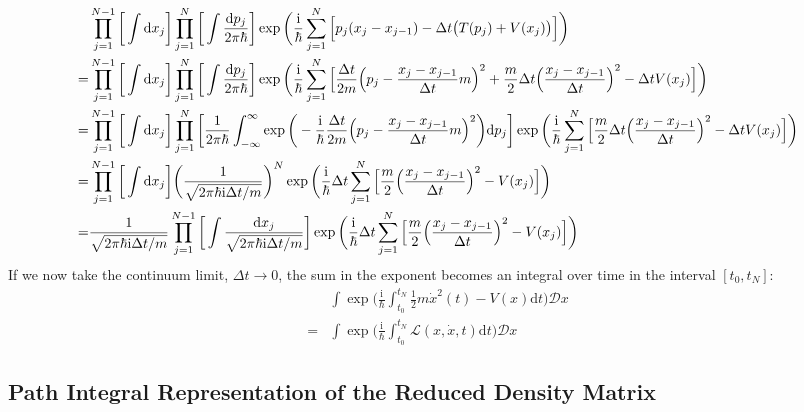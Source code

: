 \documentclass[9pt]{report}
\begin{document}
\begin{align}
&\prod_{j=1}^{N-1}\bigg[\int\mathrm{d}x_j\bigg]\prod_{j=1}^{N}\bigg[\int\frac{\mathrm{d}p_j}{2\pi\hbar}\bigg]\exp\bigg(\frac{\mathrm{i}}{\hbar}\sum_{j=1}^{N}\Big[p_j(x_j-x_{j-1})-\Delta t\big(T(p_j)+V(x_j)\big)\Big]\bigg)\\
=& \prod_{j=1}^{N-1}\bigg[\int\mathrm{d}x_j\bigg]\prod_{j=1}^{N}\bigg[\int\frac{\mathrm{d}p_j}{2\pi\hbar}\bigg]\exp\bigg(\frac{\mathrm{i}}{\hbar}\sum_{j=1}^{N}\Big[\frac{\Delta t}{2m}\Big(p_j-\frac{x_j-x_{j-1}}{\Delta t}m\Big)^2+\frac{m}{2}\Delta t\Big(\frac{x_j-x_{j-1}}{\Delta t}\Big)^2-\Delta t V(x_j)\Big]\bigg)\\
=& \prod_{j=1}^{N-1}\bigg[\int\mathrm{d}x_j\bigg]\prod_{j=1}^{N}\bigg[\frac{1}{2\pi\hbar}\int_{-\infty}^{\infty}\exp\bigg(-\frac{\mathrm{i}}{\hbar}\frac{\Delta t}{2m}\Big(p_j-\frac{x_j-x_{j-1}}{\Delta t}m\Big)^2\bigg)\mathrm{d}p_j\bigg]\exp\bigg(\frac{\mathrm{i}}{\hbar}\sum_{j=1}^{N}\Big[\frac{m}{2}\Delta t\Big(\frac{x_j-x_{j-1}}{\Delta t}\Big)^2-\Delta tV(x_j)\Big]\bigg)\notag\\
=& \prod_{j=1}^{N-1}\bigg[\int\mathrm{d}x_j\bigg]\bigg(\frac{1}{\sqrt{2\pi\hbar\mathrm{i}\Delta t/m}}\bigg)^N\exp\bigg(\frac{\mathrm{i}}{\hbar}\Delta t\sum_{j=1}^{N}\Big[\frac{m}{2}\Big(\frac{x_j-x_{j-1}}{\Delta t}\Big)^2-V(x_j)\Big]\bigg)\\
=& \frac{1}{\sqrt{2\pi\hbar\mathrm{i}\Delta t/m}}\prod_{j=1}^{N-1}\bigg[\int\frac{\mathrm{d}x_j}{\sqrt{2\pi\hbar\mathrm{i}\Delta t/m}}\bigg]\exp\bigg(\frac{\mathrm{i}}{\hbar}\Delta t\sum_{j=1}^{N}\Big[\frac{m}{2}\Big(\frac{x_j-x_{j-1}}{\Delta t}\Big)^2-V(x_j)\Big]\bigg)
\end{align}
If we now take the continuum limit, $\Delta t\to 0$, the sum in the exponent becomes an integral over time in the interval $[t_0,t_N]$:
\begin{align}
&\int\exp\bigg(\frac{\mathrm{i}}{\hbar}\int_{t_0}^{t_N}\frac{1}{2}m\dot{x}^2(t)-V(x)\mathrm{d}t\bigg)\mathcal{D}x\\
=& \int\exp\bigg(\frac{\mathrm{i}}{\hbar}\int_{t_0}^{t_N}\mathcal{L}(x,\dot{x},t)\mathrm{d}t\bigg)\mathcal{D}x
\end{align}






\subsection{Path Integral Representation of the Reduced Density Matrix}
\end{document}
